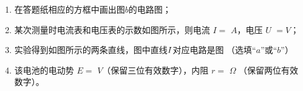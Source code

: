 \begin{enumerate}
\begin{enumerate}
\item
在答题纸相应的方框中画出图$ b $的电路图；

\item 
某次测量时电流表和电压表的示数如图所示，则电流 $ I= $ \underlinegap $A $，电压 $ U $
\underlinegap 
$ = V $；
\begin{figure}[h!]
\centering

\hfil
  
\end{figure}





\item 
实验得到如图所示的两条直线，图中直线$ \lmd{1} $对应电路是图 \underlinegap （选填“$ a $”或“$ b $”）
\begin{figure}[h!]
\centering

\end{figure}




\item 
该电池的电动势 $ E=$ \underlinegap $V $（保留三位有效数字），内阻 $ r= $ \underlinegap $ \Omega $ （保留两位有效数字）。

\end{enumerate}





\end{enumerate}
